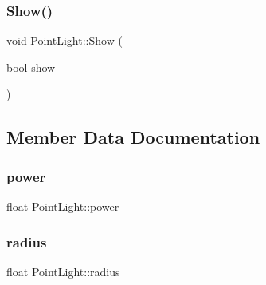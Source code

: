\hypertarget{class_point_light_ac32b90aa8e55345d9b9c330c787c9814}{}\label{class_point_light_ac32b90aa8e55345d9b9c330c787c9814} 
\subsubsection{\texorpdfstring{Show()}{Show()}}
{\footnotesize\ttfamily void Point\+Light\+::\+Show (\begin{DoxyParamCaption}\item[{bool}]{show }\end{DoxyParamCaption})}



\subsection{Member Data Documentation}
\hypertarget{class_point_light_a839f7586ba4f924bc437fd6b3a78eeaf}{}\label{class_point_light_a839f7586ba4f924bc437fd6b3a78eeaf} 
\subsubsection{\texorpdfstring{power}{power}}
{\footnotesize\ttfamily float Point\+Light\+::power}

\hypertarget{class_point_light_a49f48fc72be12660d6248c060abc0da6}{}\label{class_point_light_a49f48fc72be12660d6248c060abc0da6} 
\subsubsection{\texorpdfstring{radius}{radius}}
{\footnotesize\ttfamily float Point\+Light\+::radius}

